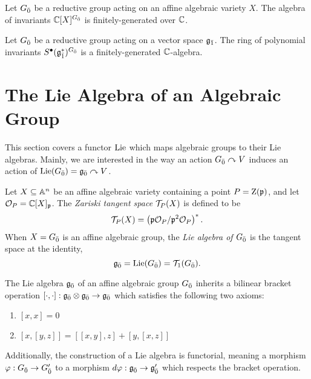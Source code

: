 \begin{proposition} \label{prop:fg-coordinate}
  Let $\even{G}$ be a reductive group acting on an affine algebraic variety $X$. The algebra of invariants $\CC[X]^{\even{G}}$ is finitely-generated over $\CC$.
\end{proposition}
\begin{corollary}
  Let $\even{G}$ be a reductive group acting on a vector space $\odd{\g}$. The ring of polynomial invariants $S^\bullet(\odd{\g}^*)^{\even{G}}$ is a finitely-generated $\CC$-algebra.
\end{corollary}

\section{The Lie Algebra of an Algebraic Group}
\label{sec:lie-algebra}

This section covers a functor $\Lie$ which maps algebraic groups to their Lie algebras. Mainly, we are interested in the way an action $\even{G} \actson V$ induces an action of $\Lie(\even{G}) = \even{\g} \actson V$.

\begin{definition}
  Let $X \subseteq \AA^n$ be an affine algebraic variety containing a point $P = \Z(\p)$, and let $\O_P = \CC[X]_\p$. The \emph{Zariski tangent space} $\T_P(X)$ is defined to be
  \begin{equation}
    \label{eq:tangent-space}
    \T_P(X) = \left(\p \O_P / \p^2 \O_P\right)^*.
  \end{equation}
  When $X = \even{G}$ is an affine algebraic group, the \emph{Lie algebra of $\even{G}$} is the tangent space at the identity,
  \begin{equation}
    \label{eq:lie-alg}
    \even{\g} = \Lie(\even{G}) = \T_1(\even{G}).
  \end{equation}
\end{definition}

\begin{proposition} \label{prop:lie-alg}
  The Lie algebra $\even{\g}$ of an affine algebraic group $\even{G}$ inherits a bilinear bracket operation $[\cdot,\cdot]: \even{\g} \otimes \even{\g} \to \even{\g}$ which satisfies the following two axioms:
  \begin{enumerate}[(L1)]
  \item $[x,x] = 0$
  \item $[x,[y,z]] = [[x,y],z] + [y,[x,z]]$
  \end{enumerate}
  Additionally, the construction of a Lie algebra is functorial, meaning a morphism $\varphi:\even{G} \to \even{G}'$ to a morphism $d\varphi:\even{\g} \to \even{\g}'$ which respects the bracket operation.
\end{proposition}

